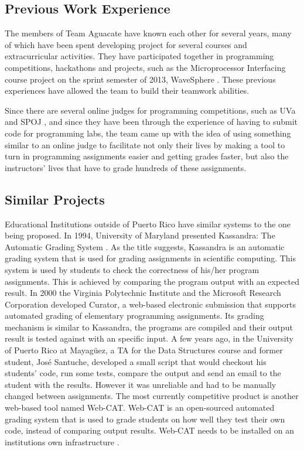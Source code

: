 
\subsection{Previous Work Experience}

The members of Team Aguacate have known each other for several years, many of
which have been spent developing project for several courses and extracurricular
activities. They have participated together in programming competitions,
hackathons and projects, such as the Microprocessor Interfacing course project
on the sprint semester of 2013, WaveSphere \cite{Micro2}. These previous
experiences have allowed the team to build their teamwork abilities.

Since there are several online judges for programming competitions, such as UVa
\cite{UVA} and SPOJ \cite{SPOJ}, and since they have been through the experience
of having to submit code for programming labs, the team came up with the idea of
using something similar to an online judge to facilitate not only their lives by
making a tool to turn in programming assignments easier and getting grades
faster, but also the instructors' lives that have to grade hundreds of these
assignments.

\subsection{Similar Projects}


Educational Institutions outside of Puerto Rico have similar systems to the one
being proposed. In 1994, University of Maryland presented Kassandra: The
Automatic Grading System \cite{Matt1994}. As the title suggests, Kassandra is an
automatic grading system that is used for grading assignments in scientific
computing. This system is used by students to check the correctness of his/her
program assignments. This is achieved by comparing the program output with an
expected result. In 2000 the Virginia Polytechnic Institute and the Microsoft
Research Corporation developed Curator, a web-based electronic submission that
supports automated grading of elementary programming assignments. \cite{Curator}
Its grading mechanism is similar to Kassandra, the programs are compiled and
their output result is tested against with an specific input. A few years ago, in
the University of Puerto Rico at Mayagüez, a TA for the Data Structures course
and former student, José Santuche, developed a small script that would checkout
his students' code, run some tests, compare the output and send an email to the
student with the results. However it was unreliable and had to be manually
changed between assignments. The most currently competitive product is another
web-based tool named Web-CAT. Web-CAT is an open-sourced automated grading
system that is used to grade students on how well they test their own code,
instead of comparing output results. Web-CAT needs to be installed on an
institutions own infrastructure \cite{WebCat}.

